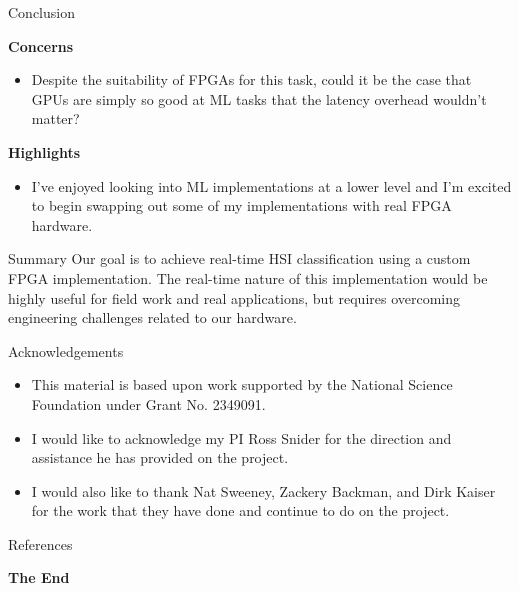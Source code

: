 \documentclass[aspectratio=169,xcolor=dvipsnames]{beamer}
\newcommand\myheading[1]{%
  \par\bigskip
  {\Large\bfseries#1}\par\smallskip}
\begin{document}

\begin{frame}{Conclusion}
    \myheading{Concerns}
    \begin{itemize}
        \item Despite the suitability of FPGAs for this task, could it be the case that GPUs are simply so good at ML tasks that the latency overhead wouldn't matter?
    \end{itemize}

    \myheading{Highlights}
    \begin{itemize}
        \item I've enjoyed looking into ML implementations at a lower level and I'm excited to begin swapping out some of my implementations with real FPGA hardware.
    \end{itemize}

    \begin{block}{Summary}
        Our goal is to achieve real-time HSI classification using a custom FPGA implementation. The real-time nature of this implementation would be highly useful for field work and real applications, but requires overcoming engineering challenges related to our hardware.
    \end{block}
\end{frame}


\begin{frame}{Acknowledgements}
    \begin{itemize}
        \item This material is based upon work supported by the National Science Foundation under Grant No. 2349091.
        \item I would like to acknowledge my PI Ross Snider for the direction and assistance he has provided on the project.
        \item I would also like to thank Nat Sweeney, Zackery Backman, and Dirk Kaiser for the work that they have done and continue to do on the project.
    \end{itemize}
\end{frame}


\begin{frame}[allowframebreaks]{References}
    \begingroup
    \tiny
    \setlength{\itemsep}{0pt}
    \setlength{\parsep}{0pt}
    \setlength{\parskip}{0pt}
    \nocite{*}
    
    
    \endgroup
\end{frame}

\begin{frame}
    \Huge{\centerline{\textbf{The End}}}
\end{frame}
\end{document}
